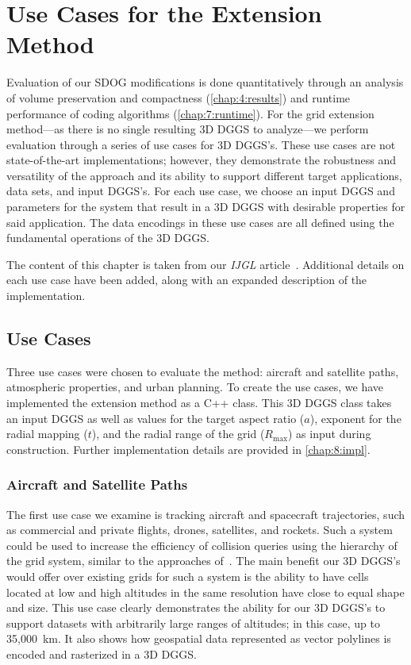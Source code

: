 \chapter{Use Cases for the Extension Method} \label{chap:usecases}
Evaluation of our SDOG modifications is done quantitatively through an analysis of volume preservation and compactness (\cref{chap:4:results}) and runtime performance of coding algorithms (\cref{chap:7:runtime}).
For the grid extension method---as there is no single resulting 3D DGGS to analyze---we perform evaluation through a series of use cases for 3D DGGS's.
These use cases are not state-of-the-art implementations; however, they demonstrate the robustness and versatility of the approach and its ability to support different target applications, data sets, and input DGGS's.
For each use case, we choose an input DGGS and parameters for the system that result in a 3D DGGS with desirable properties for said application.
The data encodings in these use cases are all defined using the fundamental operations of the 3D DGGS.


The content of this chapter is taken from our \textit{IJGL} article~\cite{ulmer2020general}.
Additional details on each use case have been added, along with an expanded description of the implementation.


\section{Use Cases}
Three use cases were chosen to evaluate the method: aircraft and satellite paths, atmospheric properties, and urban planning.
To create the use cases, we have implemented the extension method as a C++ class.
This 3D DGGS class takes an input DGGS as well as values for the target aspect ratio ($a$), exponent for the radial mapping ($t$), and the radial range of the grid ($R_\mathrm{max}$) as input during construction.
Further implementation details are provided in \cref{chap:8:impl}.


\subsection{Aircraft and Satellite Paths} \label{chap:8:sats}
The first use case we examine is tracking aircraft and spacecraft trajectories, such as commercial and private flights, drones, satellites, and rockets.
Such a system could be used to increase the efficiency of collision queries using the hierarchy of the grid system, similar to the approaches of~\cite{miao2019low, zhai2019collision}.
The main benefit our 3D DGGS's would offer over existing grids for such a system is the ability to have cells located at low and high altitudes in the same resolution have close to equal shape and size.
This use case clearly demonstrates the ability for our 3D DGGS's to support datasets with arbitrarily large ranges of altitudes; in this case, up to 35,000~km.
It also shows how geospatial data represented as vector polylines is encoded and rasterized in a 3D DGGS.



